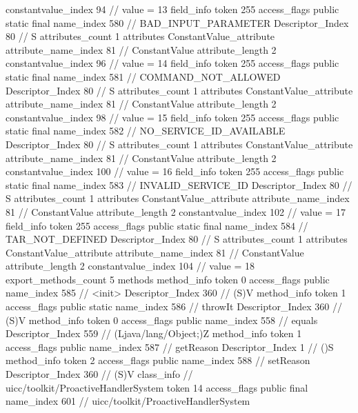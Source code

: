 {{{{{{{					constantvalue_index	94		// value = 13
				}
				}
			}
			field_info {
				token	255
				access_flags	public static final
				name_index	580		// BAD_INPUT_PARAMETER
				Descriptor_Index	80		// S
				attributes_count	1
				attributes {
				ConstantValue_attribute {
					attribute_name_index	81		// ConstantValue
					attribute_length	2
					constantvalue_index	96		// value = 14
				}
				}
			}
			field_info {
				token	255
				access_flags	public static final
				name_index	581		// COMMAND_NOT_ALLOWED
				Descriptor_Index	80		// S
				attributes_count	1
				attributes {
				ConstantValue_attribute {
					attribute_name_index	81		// ConstantValue
					attribute_length	2
					constantvalue_index	98		// value = 15
				}
				}
			}
			field_info {
				token	255
				access_flags	public static final
				name_index	582		// NO_SERVICE_ID_AVAILABLE
				Descriptor_Index	80		// S
				attributes_count	1
				attributes {
				ConstantValue_attribute {
					attribute_name_index	81		// ConstantValue
					attribute_length	2
					constantvalue_index	100		// value = 16
				}
				}
			}
			field_info {
				token	255
				access_flags	public static final
				name_index	583		// INVALID_SERVICE_ID
				Descriptor_Index	80		// S
				attributes_count	1
				attributes {
				ConstantValue_attribute {
					attribute_name_index	81		// ConstantValue
					attribute_length	2
					constantvalue_index	102		// value = 17
				}
				}
			}
			field_info {
				token	255
				access_flags	public static final
				name_index	584		// TAR_NOT_DEFINED
				Descriptor_Index	80		// S
				attributes_count	1
				attributes {
				ConstantValue_attribute {
					attribute_name_index	81		// ConstantValue
					attribute_length	2
					constantvalue_index	104		// value = 18
				}
				}
			}
			}
			export_methods_count	5
			methods {
				method_info {
					token	0
					access_flags	public
					name_index	585		// <init>
					Descriptor_Index	360		// (S)V
				}
				method_info {
					token	1
					access_flags	public static
					name_index	586		// throwIt
					Descriptor_Index	360		// (S)V
				}
				method_info {
					token	0
					access_flags	public
					name_index	558		// equals
					Descriptor_Index	559		// (Ljava/lang/Object;)Z
				}
				method_info {
					token	1
					access_flags	public
					name_index	587		// getReason
					Descriptor_Index	1		// ()S
				}
				method_info {
					token	2
					access_flags	public
					name_index	588		// setReason
					Descriptor_Index	360		// (S)V
				}
			}
		}
		class_info {		// uicc/toolkit/ProactiveHandlerSystem
			token	14
			access_flags	public final
			name_index	601		// uicc/toolkit/ProactiveHandlerSystem
}}}
